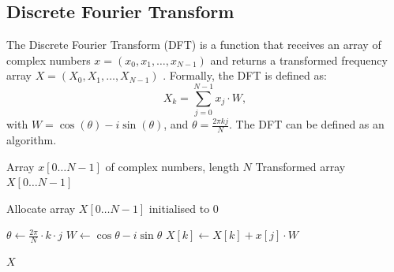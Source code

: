 \documentclass{article}
\begin{document}
\subsection{Discrete Fourier Transform}
The Discrete Fourier Transform (DFT) is a function that receives an array of complex numbers $x = (x_0, x_1, \dots, x_{N-1})$ and returns a transformed frequency array $X = (X_0, X_1, \dots, X_{N-1})$ \cite{oppenheim1989discrete}. Formally, the DFT is defined as:
\begin{equation}\label{eq:2}
  X_k = \sum_{j=0}^{N-1} x_j \cdot W ,
\end{equation}
with $W = \cos(\theta) - i\sin(\theta)$, and $\theta = \frac{2\pi k j}{N}$.
The DFT can be defined as an algorithm.
\begin{algorithm}[H]
\caption{Discrete Fourier Transform}
\begin{algorithmic}[1]
\Require Array $x[0 \dots N-1]$ of complex numbers, length $N$
\Ensure Transformed array $X[0 \dots N-1]$

    \State Allocate array $X[0 \dots N-1]$ initialised to $0$
    
            \State $\theta \gets \frac{2\pi}{N} \cdot k \cdot j$
            \State $W \gets \cos\theta - i\sin\theta$ 
            \State $X[k] \gets X[k] + x[j] \cdot W$
        \EndFor
    \EndFor
    
    \State \Return $X$
\EndProcedure
\end{algorithmic}
\end{algorithm}
%
%
%
%
%
\
\end{document}
